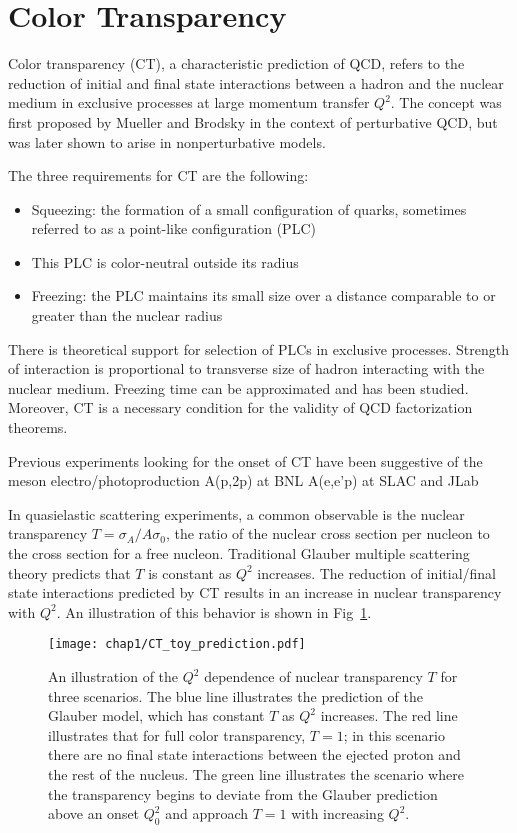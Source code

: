 \section{Color Transparency}
Color transparency (CT), a characteristic prediction of QCD, refers to the
reduction of initial and final state interactions between a hadron and the
nuclear medium in exclusive processes at large momentum transfer $Q^2$.
The concept was first proposed by Mueller and Brodsky in the context of
perturbative QCD, but was later shown to arise in nonperturbative models.


The three requirements for CT are the following:
\begin{itemize}
    \item Squeezing: the formation of a small configuration of quarks, sometimes
          referred to as a point-like configuration (PLC)
    \item This PLC is color-neutral outside its radius
    \item Freezing: the PLC maintains its small size over a distance comparable
          to or greater than the nuclear radius
\end{itemize}
There is theoretical support for selection of PLCs in exclusive processes.
Strength of interaction is proportional to transverse size of hadron interacting
with the nuclear medium.
Freezing time can be approximated and has been studied.
Moreover, CT is a necessary condition for the validity of QCD factorization
theorems.


Previous experiments looking for the onset of CT have been suggestive of the
meson electro/photoproduction
A(p,2p) at BNL
A(e,e'p) at SLAC and JLab


In quasielastic scattering experiments, a common observable is the nuclear
transparency $T=\sigma_A/A\sigma_0$, the ratio of the nuclear cross section per
nucleon to the cross section for a free nucleon.
Traditional Glauber multiple scattering theory predicts that $T$ is constant as
$Q^2$ increases.
The reduction of initial/final state interactions predicted by CT results in an
increase in nuclear transparency with $Q^2$.
An illustration of this behavior is shown in Fig~\ref{fig:CT_toy_prediction}.

\begin{figure}[!h]
    \centering
    \texttt{[image: chap1/CT\_toy\_prediction.pdf]}
    \caption{
            An illustration of the $Q^2$ dependence of nuclear transparency $T$
            for three scenarios.
            The blue line illustrates the prediction of the Glauber model,
            which has constant $T$ as $Q^2$ increases.
            The red line illustrates that for full color transparency, $T=1$;
            in this scenario there are no final state interactions between the
            ejected proton and the rest of the nucleus.
            The green line illustrates the scenario where the transparency
            begins to deviate from the Glauber prediction above an onset
            $Q_0^2$ and approach $T=1$ with increasing $Q^2$.
            }
    \label{fig:CT_toy_prediction}
\end{figure}

